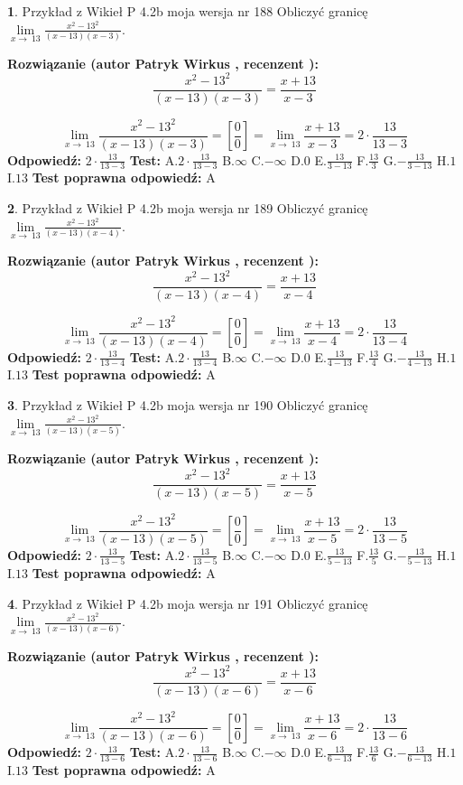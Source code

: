 \documentclass[12pt, a4paper]{article}
\theoremstyle{definition} %
\newtheorem{zad}{}
\newcommand{\zadStart}[1]{\begin{zad}#1\newline}
\newcommand{\zadStop}{\end{zad}}
\newcommand{\rozwStart}[2]{\noindent \textbf{Rozwiązanie (autor #1 , recenzent #2): }\newline}
\newcommand{\rozwStop}{\newline}
\newcommand{\odpStart}{\noindent \textbf{Odpowiedź:}\newline}
\newcommand{\odpStop}{\newline}
\newcommand{\testStart}{\noindent \textbf{Test:}\newline}
\newcommand{\testStop}{\newline}
\newcommand{\kluczStart}{\noindent \textbf{Test poprawna odpowiedź:}\newline}
\newcommand{\kluczStop}{\newline}
\begin{document}
\zadStart{Przykład z Wikieł P 4.2b moja wersja nr 188}
Obliczyć granicę $\lim\limits_{x\to\ 13}\frac{x^{2}-13^{2}}{(x-13)(x-3)}$.
\zadStop
\rozwStart{Patryk Wirkus}{}
$$\frac{x^{2}-13^{2}}{(x-13)(x-3)}=\frac{x+13}{x-3}$$

$$\lim\limits_{x\to\ 13}\frac{x^{2}-13^{2}}{(x-13)(x-3)}=[\frac{0}{0}]=\lim\limits_{x\to\ 13}\frac{x+13}{x-3}=2 \cdot \frac{13}{13-3}$$
\rozwStop
\odpStart
$2 \cdot \frac{13}{13-3}$
\odpStop
\testStart
A.$2 \cdot \frac{13}{13-3}$
B.$\infty$
C.$-\infty$
D.$0$
E.$\frac{13}{3-13}$
F.$\frac{13}{3}$
G.$-\frac{13}{3-13}$
H.$1$
I.$13$
\testStop
\kluczStart
A
\kluczStop



\zadStart{Przykład z Wikieł P 4.2b moja wersja nr 189}
Obliczyć granicę $\lim\limits_{x\to\ 13}\frac{x^{2}-13^{2}}{(x-13)(x-4)}$.
\zadStop
\rozwStart{Patryk Wirkus}{}
$$\frac{x^{2}-13^{2}}{(x-13)(x-4)}=\frac{x+13}{x-4}$$

$$\lim\limits_{x\to\ 13}\frac{x^{2}-13^{2}}{(x-13)(x-4)}=[\frac{0}{0}]=\lim\limits_{x\to\ 13}\frac{x+13}{x-4}=2 \cdot \frac{13}{13-4}$$
\rozwStop
\odpStart
$2 \cdot \frac{13}{13-4}$
\odpStop
\testStart
A.$2 \cdot \frac{13}{13-4}$
B.$\infty$
C.$-\infty$
D.$0$
E.$\frac{13}{4-13}$
F.$\frac{13}{4}$
G.$-\frac{13}{4-13}$
H.$1$
I.$13$
\testStop
\kluczStart
A
\kluczStop



\zadStart{Przykład z Wikieł P 4.2b moja wersja nr 190}
Obliczyć granicę $\lim\limits_{x\to\ 13}\frac{x^{2}-13^{2}}{(x-13)(x-5)}$.
\zadStop
\rozwStart{Patryk Wirkus}{}
$$\frac{x^{2}-13^{2}}{(x-13)(x-5)}=\frac{x+13}{x-5}$$

$$\lim\limits_{x\to\ 13}\frac{x^{2}-13^{2}}{(x-13)(x-5)}=[\frac{0}{0}]=\lim\limits_{x\to\ 13}\frac{x+13}{x-5}=2 \cdot \frac{13}{13-5}$$
\rozwStop
\odpStart
$2 \cdot \frac{13}{13-5}$
\odpStop
\testStart
A.$2 \cdot \frac{13}{13-5}$
B.$\infty$
C.$-\infty$
D.$0$
E.$\frac{13}{5-13}$
F.$\frac{13}{5}$
G.$-\frac{13}{5-13}$
H.$1$
I.$13$
\testStop
\kluczStart
A
\kluczStop



\zadStart{Przykład z Wikieł P 4.2b moja wersja nr 191}
Obliczyć granicę $\lim\limits_{x\to\ 13}\frac{x^{2}-13^{2}}{(x-13)(x-6)}$.
\zadStop
\rozwStart{Patryk Wirkus}{}
$$\frac{x^{2}-13^{2}}{(x-13)(x-6)}=\frac{x+13}{x-6}$$

$$\lim\limits_{x\to\ 13}\frac{x^{2}-13^{2}}{(x-13)(x-6)}=[\frac{0}{0}]=\lim\limits_{x\to\ 13}\frac{x+13}{x-6}=2 \cdot \frac{13}{13-6}$$
\rozwStop
\odpStart
$2 \cdot \frac{13}{13-6}$
\odpStop
\testStart
A.$2 \cdot \frac{13}{13-6}$
B.$\infty$
C.$-\infty$
D.$0$
E.$\frac{13}{6-13}$
F.$\frac{13}{6}$
G.$-\frac{13}{6-13}$
H.$1$
I.$13$
\testStop
\kluczStart
A
\kluczStop
\end{document}
